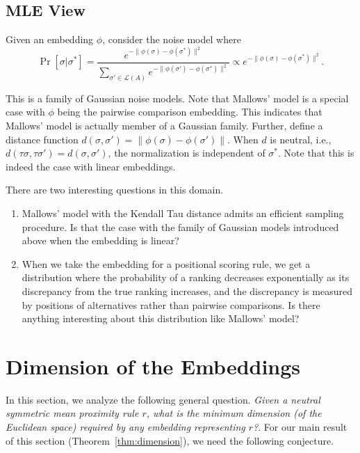 \documentclass[10pt,letterpaper]{article}
\newcommand{\calL}{{\mathcal{L}}}
\newcommand{\rank}{{\calL(A)}}
\begin{document}

\subsection{MLE View}
Given an embedding $\phi$, consider the noise model where 
$$
\Pr[\sigma | \sigma^*] = \frac{e^{-\|\phi(\sigma)-\phi(\sigma^*)\|^2}}{\sum_{\sigma' \in \rank} e^{-\|\phi(\sigma')-\phi(\sigma^*)\|^2}} \propto e^{-\|\phi(\sigma)-\phi(\sigma^*)\|^2}.
$$

This is a family of Gaussian noise models. Note that Mallows' model is a special case with $\phi$ being the pairwise comparison embedding. This indicates that Mallows' model is actually member of a Gaussian family. Further, define a distance function $d(\sigma,\sigma') = \|\phi(\sigma)-\phi(\sigma')\|$. When $d$ is neutral, i.e., $d(\tau \sigma,\tau \sigma') = d(\sigma,\sigma')$, the normalization is independent of $\sigma^*$. Note that this is indeed the case with linear embeddings. 

There are two interesting questions in this domain.
\begin{enumerate}
\item Mallows' model with the Kendall Tau distance admits an efficient sampling procedure. Is that the case with the family of Gaussian models introduced above when the embedding is linear? 
\item When we take the embedding for a positional scoring rule, we get a distribution where the probability of a ranking decreases exponentially as its discrepancy from the true ranking increases, and the discrepancy is measured by positions of alternatives rather than pairwise comparisons. Is there anything interesting about this distribution like Mallows' model?
\end{enumerate}


\section{Dimension of the Embeddings}

In this section, we analyze the following general question. \emph{Given a neutral symmetric mean proximity rule $r$, what is the minimum dimension (of the Euclidean space) required by any embedding representing $r$?}. For our main result of this section (Theorem~\ref{thm:dimension}), we need the following conjecture.
\end{document}
